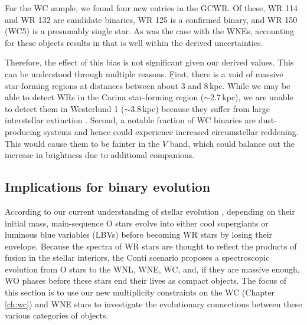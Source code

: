 For the WC sample, we found four new entries in the GCWR. Of these, WR 114 \citep[WC5\,+\,OB?:][]{2001vanderHucht} and WR 132 \citep[WC6\,+\,?:][]{1983BisiacchiWR132} are candidate binaries, WR 125 \citep[WC7ed\,+\,O9III:][]{2019WilliamsNEOWISE,2021AroraWR125} is a confirmed binary, and WR 150 (WC5) is a presumably single star. As was the case with the WNEs, accounting for these objects results in \fintWC{} that is well within the derived uncertainties.

Therefore, the effect of this bias is not significant given our derived values. This can be understood through multiple reasons. \b{First, there is a void of massive star-forming regions at distances between about 3 and 8\,kpc.} While we may be able to detect WRs in the Carina star-forming region (${\sim}$2.7\,kpc), we are unable to detect them in Westerlund 1 (${\sim}$3.8\,kpc) because they suffer from large interstellar extinction \citep{2005Clark}. Second, a notable fraction of WC binaries are dust-producing systems \citep{1995Williamsdust} and hence could experience increased circumstellar reddening. This would cause them to be fainter in the $V$ band, which could balance out the increase in brightness due to additional companions.

\subsection{Implications for binary evolution}

According to our current understanding of stellar evolution \citep{1976Conti,2003MeynetMaeder,2007Crowther}, depending on their initial mass, main-sequence O stars evolve into either cool supergiants or luminous blue variables (LBVs) before becoming WR stars by losing their envelope. Because the spectra of WR stars are thought to reflect the products of fusion in the stellar interiors, the Conti scenario \citep{1976Conti,2007Crowther} proposes a spectroscopic evolution from O stars to the WNL, WNE, WC, and, if they are massive enough, WO phases before these stars end their lives as compact objects. The focus of this section is to use our new multiplicity constraints on the WC (Chapter \ref{ch:wc}) and WNE stars to investigate the evolutionary connections between these various categories of objects.



